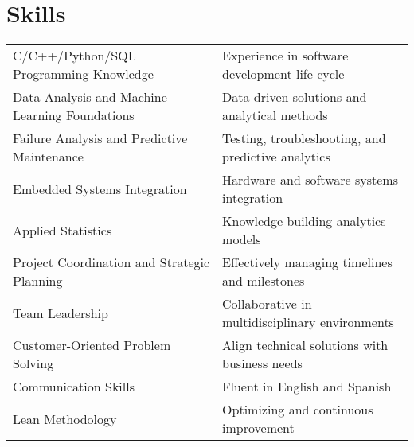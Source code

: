 \documentclass[a4paper,12pt]{article}
\begin{document}
\section{Skills}
\begin{tabularx}{\linewidth}{@{}l X@{}}
C/C++/Python/SQL Programming Knowledge &  \normalsize{Experience in software development life cycle}\\
Data Analysis and Machine Learning Foundations  &  \normalsize{Data-driven solutions and analytical methods}\\  
Failure Analysis and Predictive Maintenance  &  \normalsize{Testing, troubleshooting, and predictive analytics}\\  
Embedded Systems Integration  &  \normalsize{Hardware and software systems integration}\\  
Applied Statistics  &  \normalsize{Knowledge building analytics models}\\  
Project Coordination and Strategic Planning  &  \normalsize{Effectively managing timelines and milestones}\\  
Team Leadership  &  \normalsize{Collaborative in multidisciplinary environments}\\  
Customer-Oriented Problem Solving  &  \normalsize{Align technical solutions with business needs}\\  
Communication Skills  &  \normalsize{Fluent in English and Spanish}\\  
Lean Methodology  &  \normalsize{Optimizing and continuous improvement}\\  
\end{tabularx}

\vfill
{}
\end{document}
